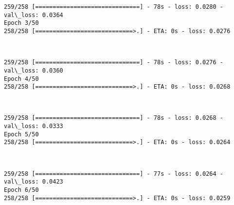 \documentclass[11pt]{article}
\begin{document}
    \begin{Verbatim}[commandchars=\\\{\}]
259/258 [==============================] - 78s - loss: 0.0280 - val\_loss: 0.0364
Epoch 3/50
258/258 [============================>.] - ETA: 0s - loss: 0.0276
    \end{Verbatim}

    \begin{center}
    \end{center}
    { \hspace*{\fill} \\}
    
    \begin{Verbatim}[commandchars=\\\{\}]
259/258 [==============================] - 78s - loss: 0.0276 - val\_loss: 0.0360
Epoch 4/50
258/258 [============================>.] - ETA: 0s - loss: 0.0268
    \end{Verbatim}

    \begin{center}
    \end{center}
    { \hspace*{\fill} \\}
    
    \begin{Verbatim}[commandchars=\\\{\}]
259/258 [==============================] - 78s - loss: 0.0268 - val\_loss: 0.0333
Epoch 5/50
258/258 [============================>.] - ETA: 0s - loss: 0.0264
    \end{Verbatim}

    \begin{center}
    \end{center}
    { \hspace*{\fill} \\}
    
    \begin{Verbatim}[commandchars=\\\{\}]
259/258 [==============================] - 77s - loss: 0.0264 - val\_loss: 0.0423
Epoch 6/50
258/258 [============================>.] - ETA: 0s - loss: 0.0259
    \end{Verbatim}

    \begin{center}
    \end{center}
    { \hspace*{\fill} \\}
    
\end{document}
